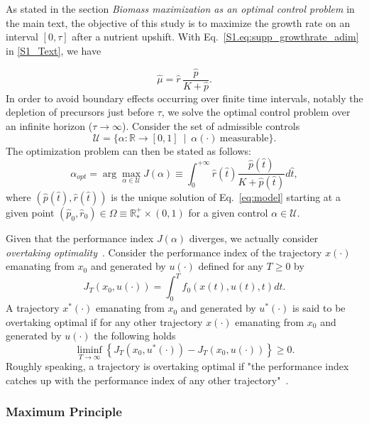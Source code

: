 As stated in the section \textit{Biomass maximization as an optimal control problem} in the main text, the objective of this study is to maximize the growth rate on an interval $[0,\tau]$ after a nutrient upshift. With Eq.~\ref{S1.eq:supp_growthrate_adim} in \ref{S1_Text}, we have
 
\begin{equation*}
\hat{\mu}= \hat{r}\, \dfrac{\hat{p}}{K+\hat{p}}.
\end{equation*}
In order to avoid boundary effects occurring over finite time intervals, notably the depletion of precursors just before $\tau$, we solve the optimal control problem over an infinite horizon ($\tau \rightarrow \infty$). Consider the set of admissible controls
\[
\mathcal{U}=\{\alpha:\mathbb{R} \rightarrow [0,1] \ \mid \ \alpha(\cdot) \ \mathrm{measurable}\}.
\]
The optimization problem can then be stated as follows:
\begin{equation}\label{Prob}
\alpha_{opt} = \arg \max_{\alpha \in \mathcal{U}} J(\alpha)\equiv \int_0^{+\infty} \hat{r}(\hat{t}) \frac{\hat{p}(\hat{t})}{K + \hat{p}(\hat{t})} d\hat{t} ,
\end{equation}
where $(\hat{p}(\hat{t}),\hat{r}(\hat{t}))$ is the unique solution of Eq.~\ref{eq:model} starting at a given point $(\hat{p}_0,\hat{r}_0)\in \Omega \equiv \mathbb{R}^+_* \times (0,1)$ for a given control $\alpha\in \mathcal{U}$.

Given that the performance index $J(\alpha)$ diverges, we actually consider \textit{overtaking optimality}~\cite{carlson_infinite_1991}.
Consider the performance index of the trajectory $x(\cdot)$ emanating from $x_0$ and generated by $u(\cdot)$ defined for any $T\geq 0$ by
$$
J_T(x_0,u(\cdot))=\int_0^T f_0(x(t),u(t),t)dt.
$$
A trajectory $x^*(\cdot)$ emanating from $x_0$ and generated by $u^*(\cdot)$ is said to be overtaking optimal if for any other trajectory $x(\cdot)$ emanating from $x_0$ and generated by $u(\cdot)$ the following holds
$$
\liminf_{T\rightarrow\infty} \left\lbrace J_T(x_0,u^*(\cdot)) - J_T(x_0,u(\cdot))\right\rbrace\geq 0.
$$
Roughly speaking, a trajectory is overtaking optimal if "the performance index catches up with the performance index of any other trajectory"~\cite{carlson_infinite_1991}.

\subsubsection{Maximum Principle}


